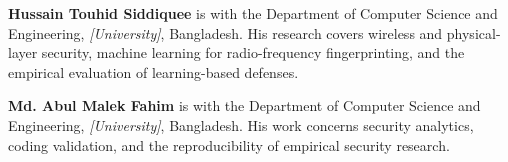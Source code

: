\documentclass[10.5pt,compsoc,winfonts]{ICN}
\begin{document}
\begin{biographynophoto}
\textbf{Hussain Touhid Siddiquee} is with the Department of Computer Science and Engineering,
\emph{[University]}, Bangladesh. His research covers wireless and physical-layer security,
machine learning for radio-frequency fingerprinting, and the empirical evaluation of
learning-based defenses.
\end{biographynophoto}

\begin{biographynophoto}
\textbf{Md. Abul Malek Fahim} is with the Department of Computer Science and Engineering,
\emph{[University]}, Bangladesh. His work concerns security analytics, coding validation, and
the reproducibility of empirical security research.
\end{biographynophoto}
\end{document}
